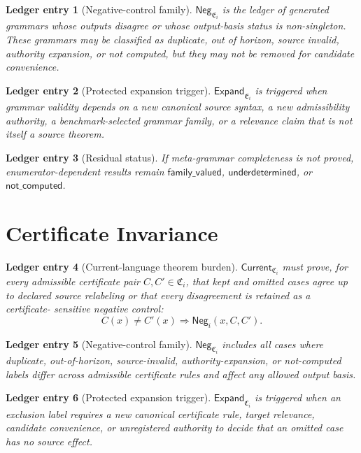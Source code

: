 \documentclass[11pt]{article}
\newcommand{\EnumFam}{\mathfrak{E}}
\newcommand{\CertFam}{\mathfrak{C}}
\newcommand{\Neg}{\mathsf{Neg}}
\newcommand{\Current}{\mathsf{Current}}
\newcommand{\Expand}{\mathsf{Expand}}
\newtheorem{ledgerentry}{Ledger entry}
\begin{document}
\begin{ledgerentry}[Negative-control family]
\(\Neg_{\EnumFam_i}\) is the ledger of generated grammars whose outputs
disagree or whose output-basis status is non-singleton. These grammars may be
classified as duplicate, out of horizon, source invalid, authority expansion,
or not computed, but they may not be removed for candidate convenience.
\end{ledgerentry}

\begin{ledgerentry}[Protected expansion trigger]
\(\Expand_{\EnumFam_i}\) is triggered when grammar validity depends on a new
canonical source syntax, a new admissibility authority, a benchmark-selected
grammar family, or a relevance claim that is not itself a source theorem.
\end{ledgerentry}

\begin{ledgerentry}[Residual status]
If meta-grammar completeness is not proved, enumerator-dependent results
remain \(\mathsf{family\_valued}\), \(\mathsf{underdetermined}\), or
\(\mathsf{not\_computed}\).
\end{ledgerentry}

\section{Certificate Invariance}

\begin{ledgerentry}[Current-language theorem burden]
\(\Current_{\CertFam_i}\) must prove, for every admissible certificate pair
\(C,C'\in\CertFam_i\), that kept and omitted cases agree up to declared
source relabeling or that every disagreement is retained as a certificate-
sensitive negative control:
\[
C(x)\neq C'(x)\Rightarrow \Neg_i(x,C,C').
\]
\end{ledgerentry}

\begin{ledgerentry}[Negative-control family]
\(\Neg_{\CertFam_i}\) includes all cases where duplicate, out-of-horizon,
source-invalid, authority-expansion, or not-computed labels differ across
admissible certificate rules and affect any allowed output basis.
\end{ledgerentry}

\begin{ledgerentry}[Protected expansion trigger]
\(\Expand_{\CertFam_i}\) is triggered when an exclusion label requires a new
canonical certificate rule, target relevance, candidate convenience, or
unregistered authority to decide that an omitted case has no source effect.
\end{ledgerentry}
\end{document}
